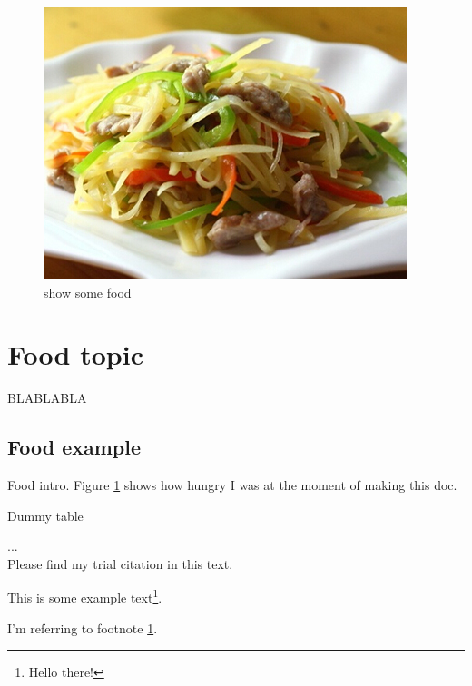 \documentclass{article}
\begin{document}
\tableofcontents                          %
\newpage

\begin{figure}
  \includegraphics[width=\linewidth]{hungry.jpg}
  \caption{show some food}
  \label{fig:food1}                       %
\end{figure}

\section{Food topic}

BLABLABLA

\subsection{Food example}

Food intro. Figure \ref{fig:food1} shows how hungry I was at the moment of making this doc.


\begin{table}[h!]                       %
  \caption{Dummy table}
\end{table}
...\\
Please find my trial citation \cite{ROGERS:2010} in this text.   \par

This is some example text\footnote{\label{myfootnote}Hello there!}. \par         %
I'm referring to footnote \ref{myfootnote}.

\newpage
\begin{appendix}                        %
  \listoffigures
  \listoftables
\end{appendix}


\newpage
% 
% 
\end{document}

